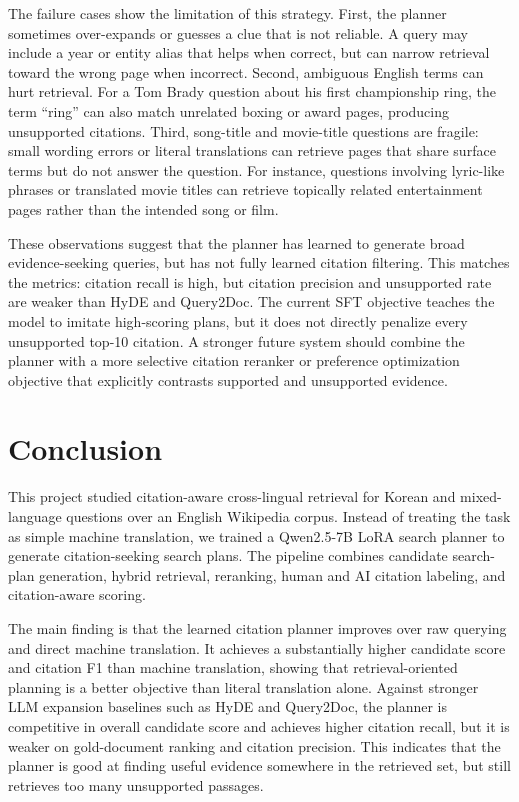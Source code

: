 The failure cases show the limitation of this strategy. First, the planner sometimes over-expands or guesses a clue that is not reliable. A query may include a year or entity alias that helps when correct, but can narrow retrieval toward the wrong page when incorrect. Second, ambiguous English terms can hurt retrieval. For a Tom Brady question about his first championship ring, the term ``ring'' can also match unrelated boxing or award pages, producing unsupported citations. Third, song-title and movie-title questions are fragile: small wording errors or literal translations can retrieve pages that share surface terms but do not answer the question. For instance, questions involving lyric-like phrases or translated movie titles can retrieve topically related entertainment pages rather than the intended song or film.

These observations suggest that the planner has learned to generate broad evidence-seeking queries, but has not fully learned citation filtering. This matches the metrics: citation recall is high, but citation precision and unsupported rate are weaker than HyDE and Query2Doc. The current SFT objective teaches the model to imitate high-scoring plans, but it does not directly penalize every unsupported top-10 citation. A stronger future system should combine the planner with a more selective citation reranker or preference optimization objective that explicitly contrasts supported and unsupported evidence.

\section{Conclusion}
\label{sec:conclusion}

This project studied citation-aware cross-lingual retrieval for Korean and mixed-language questions over an English Wikipedia corpus. Instead of treating the task as simple machine translation, we trained a Qwen2.5-7B LoRA search planner to generate citation-seeking search plans. The pipeline combines candidate search-plan generation, hybrid retrieval, reranking, human and AI citation labeling, and citation-aware scoring.

The main finding is that the learned citation planner improves over raw querying and direct machine translation. It achieves a substantially higher candidate score and citation F1 than machine translation, showing that retrieval-oriented planning is a better objective than literal translation alone. Against stronger LLM expansion baselines such as HyDE and Query2Doc, the planner is competitive in overall candidate score and achieves higher citation recall, but it is weaker on gold-document ranking and citation precision. This indicates that the planner is good at finding useful evidence somewhere in the retrieved set, but still retrieves too many unsupported passages.


